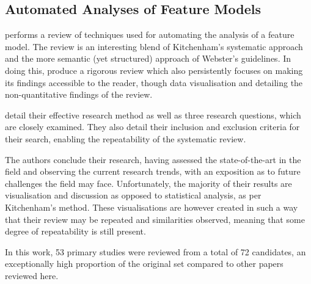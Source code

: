 \subsection{Automated Analyses of Feature Models}
\citet*{Benavides} performs a review of techniques used for automating the analysis of a feature model. The review is an interesting blend of Kitchenham's systematic approach and the more semantic (yet structured) approach of Webster's guidelines. In doing this, \citeauthor{Benavides} produce a rigorous review which also persistently focuses on making its findings accessible to the reader, though data visualisation and detailing the non-quantitative findings of the review.\par

\citeauthor{Benavides} detail their effective research method as well as three research questions, which are closely examined. They also detail their inclusion and exclusion criteria for their search, enabling the repeatability of the systematic review. \par

The authors conclude their research, having assessed the state-of-the-art in the field and observing the current research trends, with an exposition as to future challenges the field may face. Unfortunately, the majority of their results are visualisation and discussion as opposed to statistical analysis, as per Kitchenham's method. These visualisations are however created in such a way that their review may be repeated and similarities observed, meaning that some degree of repeatability is still present.\par

In this work, 53 primary studies were reviewed from a total of 72 candidates, an exceptionally high proportion of the original set compared to other papers reviewed here.\par
